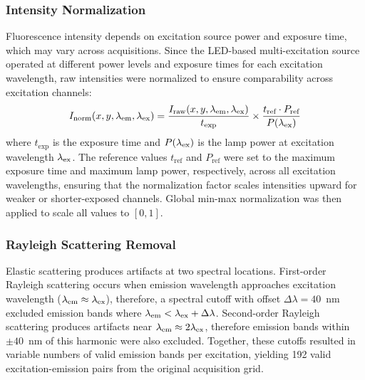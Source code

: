 \subsubsection{Intensity Normalization}
Fluorescence intensity depends on excitation source power and exposure time, which may vary across acquisitions.
Since the LED-based multi-excitation source operated at different power levels and exposure times for each excitation wavelength, raw intensities were normalized to ensure comparability across excitation channels:
\begin{equation}
I_{\text{norm}}(x, y, \lambda_{\text{em}}, \lambda_{\text{ex}}) = \frac{I_{\text{raw}}(x, y, \lambda_{\text{em}}, \lambda_{\text{ex}})}{t_{\text{exp}}} \times \frac{t_{\text{ref}} \cdot P_{\text{ref}}}{P(\lambda_{\text{ex}})}
\label{eq:normalization}
\end{equation}
where $t_{\text{exp}}$ is the exposure time and $P(\lambda_{\text{ex}})$ is the lamp power at excitation wavelength $\lambda_{\text{ex}}$.
The reference values $t_{\text{ref}}$ and $P_{\text{ref}}$ were set to the maximum exposure time and maximum lamp power, respectively, across all excitation wavelengths, ensuring that the normalization factor scales intensities upward for weaker or shorter-exposed channels.
Global min-max normalization was then applied to scale all values to $[0, 1]$.

\subsubsection{Rayleigh Scattering Removal}
Elastic scattering produces artifacts at two spectral locations.
First-order Rayleigh scattering occurs when emission wavelength approaches excitation wavelength ($\lambda_{\text{em}} \approx \lambda_{\text{ex}}$), therefore, a spectral cutoff with offset $\Delta\lambda = 40$\, nm excluded emission bands where $\lambda_{\text{em}} < \lambda_{\text{ex}} + \Delta\lambda$.
Second-order Rayleigh scattering produces artifacts near $\lambda_{\text{em}} \approx 2\lambda_{\text{ex}}$, therefore emission bands within $\pm 40$\, nm of this harmonic were also excluded.
Together, these cutoffs resulted in variable numbers of valid emission bands per excitation, yielding 192 valid excitation-emission pairs from the original acquisition grid.

